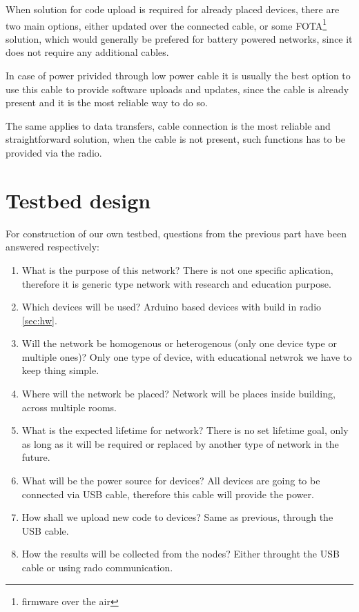 \documentclass[
  digital, %
  table,   %
  nolof,     %
  nolot,     %
           oneside
]{fithesis3}
\begin{document}
  When solution for code upload is required for already placed devices, there are two main options, either updated over the connected cable, or some FOTA\footnote{firmware over the air} solution, which would generally be prefered for battery powered networks, since it does not require any additional cables.

  In case of power privided through low power cable it is usually the best option to use this cable to provide software uploads and updates, since the cable is already present and it is the most reliable way to do so.

  The same applies to data transfers, cable connection is the most reliable and straightforward solution, when the cable is not present, such functions has to be provided via the radio.

  \section{Testbed design}
  For construction of our own testbed, questions from the previous part have been answered respectively:
  \begin{enumerate}

    \item What is the purpose of this network? There is not one specific aplication, therefore it is generic type network with research and education purpose.
    \item Which devices will be used? Arduino based devices with build in radio \ref{sec:hw}.
    \item Will the network be homogenous or heterogenous (only one device type or multiple ones)? Only one type of device, with educational netwrok we have to keep thing simple.
    \item Where will the network be placed? Network will be places inside building, across multiple rooms.
    \item What is the expected lifetime for network? There is no set lifetime goal, only as long as it will be required or replaced by another type of network in the future.
    \item What will be the power source for devices? All devices are going to be connected via USB cable, therefore this cable will provide the power.
    \item How shall we upload new code to devices? Same as previous, through the USB cable.
    \item How the results will be collected from the nodes? Either throught the USB cable or using rado communication.

  \end{enumerate}
\end{document}
